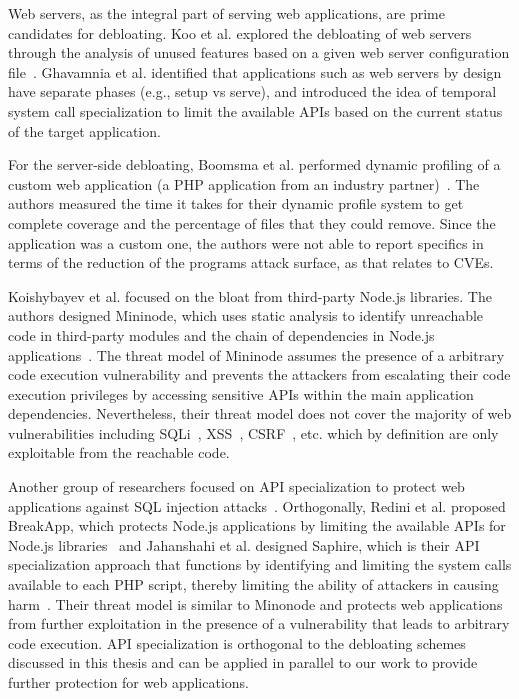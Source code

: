 Web servers, as the integral part of serving web applications, are prime candidates for debloating. 
Koo et al. explored the debloating of web servers through the analysis of unused features based on a given web server configuration file~\cite{koo2019configuration}. 
Ghavamnia et al. identified that applications such as web servers by design have separate phases (e.g., setup vs serve), and introduced the idea of temporal system call specialization to limit the available APIs based on the current status of the target application. 

For the server-side debloating, Boomsma et al. performed dynamic profiling of a custom web application (a PHP application from an industry partner)~\cite{boomsma2012Dead}. 
The authors measured the time it takes for their dynamic profile system to get
complete coverage and the percentage of files that they could remove. Since the
application was a custom one, the authors were not able to report specifics
in terms of the reduction of the programs attack surface, as that relates
to CVEs. 

Koishybayev et al. focused on the bloat from third-party Node.js libraries. 
The authors designed Mininode, which uses static analysis to identify unreachable code in third-party modules and the chain of dependencies in Node.js applications~\cite{mininode}. 
The threat model of Mininode assumes the presence of a arbitrary code execution vulnerability and prevents the attackers from escalating their code execution privileges by accessing sensitive APIs within the main application dependencies. 
Nevertheless, their threat model does not cover the majority of web vulnerabilities including SQLi~\cite{sqlInjection}, XSS~\cite{xss}, CSRF~\cite{csrf}, etc. which by definition are only exploitable from the reachable code. 

Another group of researchers focused on API specialization to protect web applications against SQL injection attacks~\cite{jahanshahi2020you}.
Orthogonally, Redini et al. proposed BreakApp, which protects Node.js applications by limiting the available APIs for Node.js libraries~\cite{vasilakis2018breakapp} and Jahanshahi et al. designed Saphire, which is their API specialization approach that functions by identifying and limiting the system calls available to each PHP script, thereby limiting the ability of attackers in causing harm~\cite{saphire}. 
Their threat model is similar to Minonode and protects web applications from further exploitation in the presence of a vulnerability that leads to arbitrary code execution. 
API specialization is orthogonal to the debloating schemes discussed in this thesis and can be applied in parallel to our work to provide further protection for web applications. 


